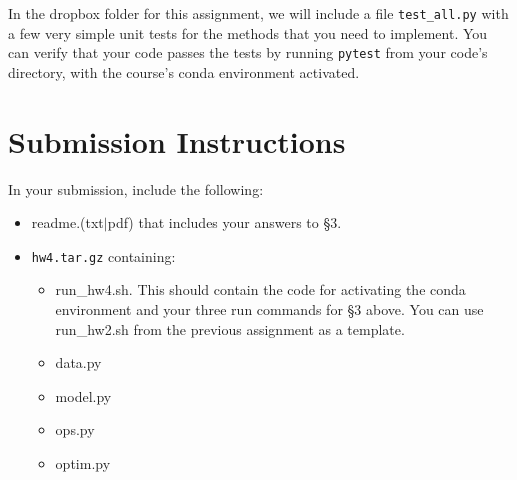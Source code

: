 \documentclass[11pt]{article}
\begin{document}
In the dropbox folder for this assignment, we will include a file \texttt{test\_all.py} with a few very simple unit tests for the methods that you need to implement.  You can verify that your code passes the tests by running \texttt{pytest} from your code's directory, with the course's conda environment activated.


\section*{Submission Instructions}

In your submission, include the following:
\begin{itemize}
  \item readme.(txt$\mid$pdf) that includes your answers to \S3. 
  \item \texttt{hw4.tar.gz} containing:
  \begin{itemize}
    \item run\_hw4.sh.  This should contain the code for activating the conda environment and your three run commands for \S3 above.  You can use run\_hw2.sh from the previous assignment as a template.
    \item data.py
    \item model.py
    \item ops.py
    \item optim.py
  \end{itemize}
\end{itemize}
\end{document}
